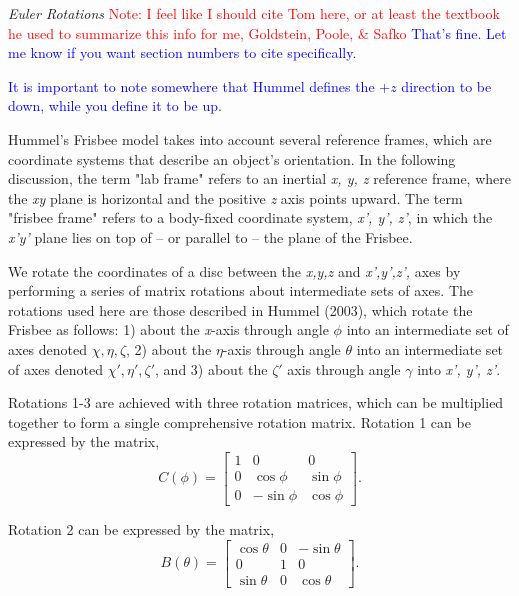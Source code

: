 \documentclass[a4paper,12pt, oneside]{article}
\newcommand{\red}[1]{\textcolor{red}{#1}}
\newcommand{\blue}[1]{\textcolor{blue}{#1}}
\begin{document}
\textit{Euler Rotations} \newline
\red{Note: I feel like I should cite Tom here, or at least the textbook he used to summarize this info for me, Goldstein, Poole, \& Safko}
\blue{That's fine. Let me know if you want section numbers to cite specifically.}

\blue{It is important to note somewhere that Hummel defines the +$z$ direction to be down, while you define it to be up.}

Hummel's Frisbee model takes into account several reference frames, which are coordinate systems that describe an object's orientation.  In the following discussion, the term "lab frame" refers to an inertial \textit{x, y, z} reference frame, where the \textit{xy} plane is horizontal and the positive \textit{z} axis points upward.  The term "frisbee frame" refers to a body-fixed coordinate system, \textit{x', y', z'}, in which the \textit{x'y'} plane lies on top of -- or parallel to -- the plane of the Frisbee.

We rotate the coordinates of a disc between the \textit{x,y,z} and \textit{x',y',z',} axes by performing a series of matrix rotations about intermediate sets of axes.  The rotations used here are those described in Hummel (2003), which rotate the Frisbee as follows: 1) about the \textit{x}-axis through angle $\phi$ into an intermediate set of axes denoted $\chi,\eta,\zeta$, 2) about the $\eta$-axis through angle $\theta$ into an intermediate set of axes denoted $\chi',\eta',\zeta'$, and 3) about the $\zeta'$ axis through angle $\gamma$ into \textit{x', y', z'}.

Rotations 1-3 are achieved with three rotation matrices, which can be multiplied together to form a single comprehensive rotation matrix. Rotation 1 can be expressed by the matrix,
\begin{equation*}
C(\phi)=\begin{bmatrix}
1 & 0 & 0 \\
0 & \cos\phi & \sin\phi \\
0 & -\sin\phi & \cos\phi
\end{bmatrix}.
\end{equation*}

Rotation 2 can be expressed by the matrix, 
\begin{equation*}
B(\theta)=\begin{bmatrix}
\cos\theta & 0 & -\sin\theta \\
0 & 1 & 0 \\
\sin\theta & 0 & \cos\theta
\end{bmatrix}.
\end{equation*}
\end{document}
